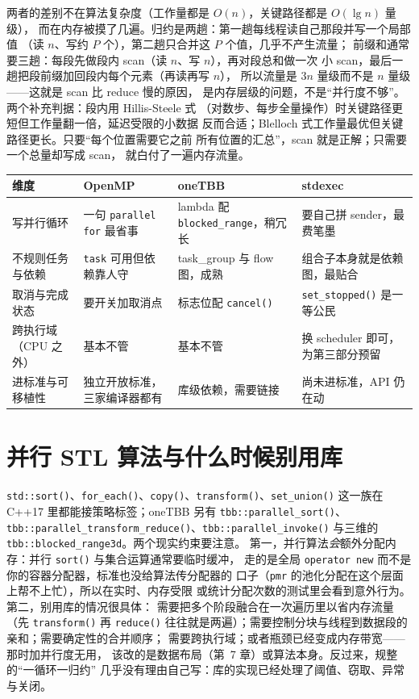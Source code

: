 \documentclass[12pt,a4paper,fontset=fandol]{ctexbook}
\newcommand{\cpp}[1]{C++#1}
\newcommand{\Fn}[1]{\texttt{#1()}}
\newcommand{\Tp}[1]{\texttt{#1}}
\newcommand{\Bk}{\allowbreak}
\begin{document}
两者的差别不在算法复杂度（工作量都是 $O(n)$，关键路径都是 $O(\lg n)$ 量级），
而在内存被摸了几遍。归约是两趟：第一趟每线程读自己那段并写一个局部值
（读 $n$、写约 $P$ 个），第二趟只合并这 $P$ 个值，几乎不产生流量；
前缀和通常要三趟：每段先做段内 scan（读 $n$、写 $n$），再对段总和做一次
小 scan，最后一趟把段前缀加回段内每个元素（再读再写 $n$），
所以流量是 $3n$ 量级而不是 $n$ 量级——这就是 scan 比 reduce 慢的原因，
是内存层级的问题，不是``并行度不够''。两个补充判据：段内用 Hillis-Steele 式
（对数步、每步全量操作）时关键路径更短但工作量翻一倍，延迟受限的小数据
反而合适；Blelloch 式工作量最优但关键路径更长。只要``每个位置需要它之前
所有位置的汇总''，scan 就是正解；只需要一个总量却写成 scan，
就白付了一遍内存流量。

\begin{compare}[title={OpenMP、oneTBB 与 stdexec 的表达力对照}]
\begin{tabular}{@{}>{\raggedright\arraybackslash}p{}
  >{\raggedright\arraybackslash}p{}
  >{\raggedright\arraybackslash}p{}
  >{\raggedright\arraybackslash}p{}@{}}
\toprule
维度 & OpenMP & oneTBB & stdexec \\
\midrule
写并行循环 & 一句 \Tp{parallel for} 最省事 &
lambda 配 \Tp{blocked\Bk\_range}，稍冗长 &
要自己拼 sender，最费笔墨 \\
不规则任务与依赖 & \Tp{task} 可用但依赖靠人守 &
task\_group 与 flow 图，成熟 &
组合子本身就是依赖图，最贴合 \\
取消与完成状态 & 要开关加取消点 & 标志位配 \Fn{cancel} &
\Fn{set\Bk\_stopped} 是一等公民 \\
跨执行域（CPU 之外） & 基本不管 & 基本不管 &
换 scheduler 即可，为第三部分预留 \\
进标准与可移植性 & 独立开放标准，三家编译器都有 &
库级依赖，需要链接 & 尚未进标准，API 仍在动 \\
\bottomrule
\end{tabular}
\end{compare}

\section{并行 STL 算法与什么时候别用库}

\Fn{std::sort}、\Fn{for\_each}、\Fn{copy}、\Fn{transform}、\Fn{set\_union}
这一族在 \cpp{17} 里都能接策略标签；oneTBB 另有 \Fn{tbb::parallel\_{\Bk}sort}、
\Fn{tbb::parallel\_{\Bk}transform\_{\Bk}reduce}、\Fn{tbb::parallel\_{\Bk}invoke}
与三维的 \Tp{tbb::blocked\_{\Bk}range3d}。两个现实约束要注意。
第一，并行算法\emph{会}额外分配内存：并行 \Fn{sort} 与集合运算通常要临时缓冲，
走的是全局 \Tp{operator new} 而不是你的容器分配器，标准也没给算法传分配器的
口子（\Tp{pmr} 的池化分配在这个层面上帮不上忙），所以在实时、内存受限
或统计分配次数的测试里会看到意外行为。第二，别用库的情况很具体：
需要把多个阶段融合在一次遍历里以省内存流量（先 \Fn{transform} 再 \Fn{reduce}
往往就是两遍）；需要控制分块与线程到数据段的亲和；需要确定性的合并顺序；
需要跨执行域；或者瓶颈已经变成内存带宽——那时加并行度无用，
该改的是数据布局（第~7 章）或算法本身。反过来，规整的``一循环一归约''
几乎没有理由自己写：库的实现已经处理了阈值、窃取、异常与关闭。
\end{document}
